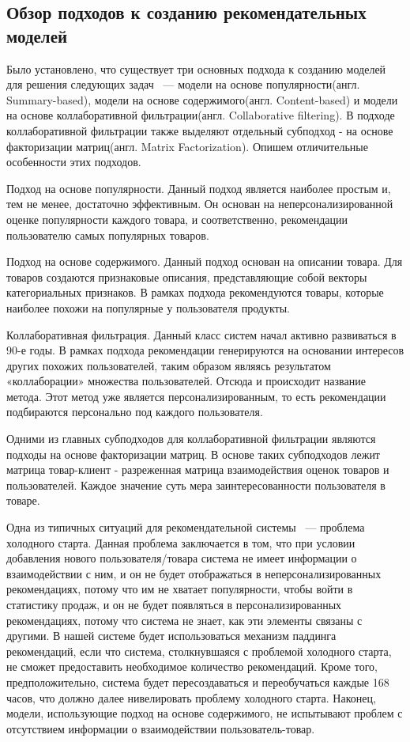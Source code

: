 \documentclass[14pt]{mmcs_article}
\begin{document}
\subsection{Обзор подходов к созданию рекомендательных моделей}
Было установлено, что существует три основных подхода к созданию моделей для решения следующих задач ~--- модели на основе популярности(англ. Summary-based), модели на основе содержимого(англ. Content-based) и модели на основе коллаборативной фильтрации(англ. Collaborative filtering). В подходе коллаборативной фильтрации также выделяют отдельный субподход - на основе факторизации матриц(англ. Matrix Factorization).  Опишем отличительные особенности этих подходов. 

Подход на основе популярности. Данный подход является наиболее простым и, тем не менее, достаточно эффективным. Он основан на неперсонализированной оценке популярности каждого товара, и соответственно, рекомендации пользователю самых популярных товаров.

Подход на основе содержимого. Данный подход основан на описании товара. Для товаров создаются признаковые описания, представляющие собой векторы категориальных признаков. В рамках подхода рекомендуются товары, которые наиболее похожи на популярные у пользователя продукты.

Коллаборативная фильтрация. Данный класс систем начал активно развиваться в 90-е годы. В рамках подхода рекомендации генерируются на основании интересов других похожих пользователей, таким образом являясь результатом «коллаборации» множества пользователей. Отсюда и  происходит название метода. Этот метод уже является персонализированным, то есть рекомендации подбираются персонально под каждого пользователя.

Одними из главных субподходов для коллаборативной фильтрации являются подходы на основе факторизации матриц. В основе таких субподходов лежит матрица товар-клиент - разреженная матрица взаимодействия оценок товаров и пользователей. Каждое значение суть мера заинтересованности пользователя в товаре. 

Одна из типичных ситуаций для рекомендательной системы ~--- проблема холодного старта. Данная проблема заключается в том, что при условии добавления нового пользователя/товара система не имеет информации о взаимодействии с ним, и он не будет отображаться в неперсонализированных рекомендациях, потому что им не хватает популярности, чтобы войти в статистику продаж, и он не будет появляться в персонализированных рекомендациях, потому что система не знает, как эти элементы связаны с другими. В нашей системе будет использоваться механизм паддинга рекомендаций, если что система, столкнувшаяся с проблемой холодного старта, не сможет предоставить необходимое количество рекомендаций.  Кроме того, предположительно, система будет пересоздаваться и переобучаться каждые 168 часов, что должно далее нивелировать проблему холодного старта. Наконец, модели, использующие подход на основе содержимого, не испытывают проблем с отсутствием информации о взаимодействии пользователь-товар.
\end{document}
